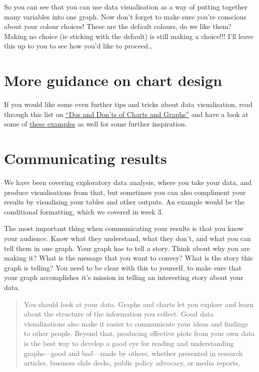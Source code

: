 \documentclass[
]{book}
\begin{document}
So you can see that you can use data visualisation as a way of putting together many variables into one graph. Now don't forget to make sure you're conscious about your colour choices! These are the default colours, do we like them? Making no choice (ie sticking with the default) is still making a choice!!! I'll leave this up to you to see how you'd like to proceed\ldots{}

\hypertarget{more-guidance-on-chart-design}{%
\section{More guidance on chart design}\label{more-guidance-on-chart-design}}

If you would like some even further tips and tricks about data visualisation, read through this list on \href{https://guides.library.duke.edu/datavis/topten}{``Dos and Don'ts of Charts and Graphs''} and have a look at some of \href{http://datajournalismhandbook.org/1.0/en/introduction_3.html}{these examples} as well for some further inspiration.

\hypertarget{communicating-results}{%
\section{Communicating results}\label{communicating-results}}

We have been covering exploratory data analysis, where you take your data, and produce visualisations from that, but sometimes you can also compliment your results by visualising your tables and other outputs. An example would be the conditional formatting, which we covered in week 3.

The most important thing when communicating your results is that you know your audience. Know what they understand, what they don't, and what you can tell them in one graph. Your graph has to tell a story. Think about why you are making it? What is the message that you want to convey? What is the story this graph is telling? You need to be clear with this to yourself, to make sure that your graph accomplishes it's mission in telling an interesting story about your data.

\begin{quote}
You should look at your data. Graphs and charts let you explore and learn about the structure of the information you collect. Good data visualizations also make it easier to communicate your ideas and findings to other people. Beyond that, producing effective plots from your own data is the best way to develop a good eye for reading and understanding graphs---good and bad---made by others, whether presented in research articles, business slide decks, public policy advocacy, or media reports.
\end{quote}
\end{document}
